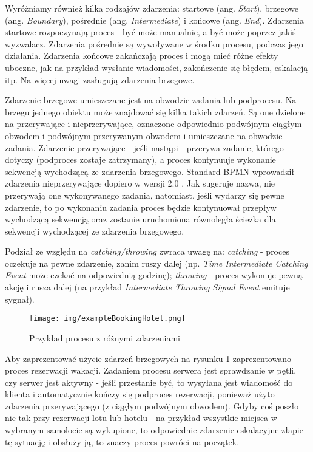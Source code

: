 \documentclass[declaration,shortabstract,mgr]{iithesis}
\newcommand{\bpmn}{BPMN }
\begin{document}
Wyróżniamy również kilka rodzajów zdarzenia: startowe (ang. \textit{Start}), brzegowe (ang. \textit{Boundary}), pośrednie (ang. \textit{Intermediate}) i końcowe (ang. \textit{End}). Zdarzenia startowe rozpoczynają proces - być może manualnie, a być może poprzez jakiś wyzwalacz. Zdarzenia pośrednie są wywoływane w środku procesu, podczas jego działania. Zdarzenia końcowe zakańczają proces i mogą mieć różne efekty uboczne, jak na przykład wysłanie wiadomości, zakończenie się błędem, eskalacją itp. Na więcej uwagi zasługują zdarzenia brzegowe.

Zdarzenie brzegowe umieszczane jest na obwodzie zadania lub podprocesu. Na brzegu jednego obiektu może znajdować się kilka takich zdarzeń. Są one dzielone na przerywające i nieprzerywające, oznaczone odpowiednio podwójnym ciągłym obwodem i podwójnym przerywanym obwodem i umieszczane na obwodzie zadania. Zdarzenie przerywające - jeśli nastąpi - przerywa zadanie, którego dotyczy (podproces zostaje zatrzymany), a proces kontynuuje wykonanie sekwencją wychodzącą ze zdarzenia brzegowego. Standard \bpmn wprowadził zdarzenia nieprzerywające dopiero w wersji 2.0 \cite{bruce-silver-bpmn-boundary-events-v2}. Jak sugeruje nazwa, nie przerywają one wykonywanego zadania, natomiast, jeśli wydarzy się pewne zdarzenie, to po wykonaniu zadania proces będzie kontynuował przepływ wychodzącą sekwencją oraz zostanie uruchomiona równoległa ścieżka dla sekwencji wychodzącej ze zdarzenia brzegowego.

 Podział ze względu na \textit{catching/throwing} zwraca uwagę na: \textit{catching} - proces oczekuje na pewne zdarzenie, zanim ruszy dalej (np. \textit{Time Intermediate Catching Event} może czekać na odpowiednią godzinę); \textit{throwing} - proces wykonuje pewną akcję i rusza dalej (na przykład \textit{Intermediate Throwing Signal Event} emituje sygnał). 

\begin{figure}[H]
    \texttt{[image: img/exampleBookingHotel.png]}
    \caption{Przykład procesu z różnymi zdarzeniami}
    \label{fig:exampleBookingHotel}
\end{figure}

Aby zaprezentować użycie zdarzeń brzegowych na rysunku \ref{fig:exampleBookingHotel} zaprezentowano proces rezerwacji wakacji. Zadaniem procesu serwera jest sprawdzanie w pętli, czy serwer jest aktywny - jeśli przestanie być, to wysyłana jest wiadomość do klienta i automatycznie kończy się podproces rezerwacji, ponieważ użyto zdarzenia przerywającego (z ciągłym podwójnym obwodem). Gdyby coś poszło nie tak przy rezerwacji lotu lub hotelu - na przykład wszystkie miejsca w wybranym samolocie są wykupione, to odpowiednie zdarzenie eskalacyjne złapie tę sytuację i obsłuży ją, to znaczy proces powróci na początek.
\end{document}
